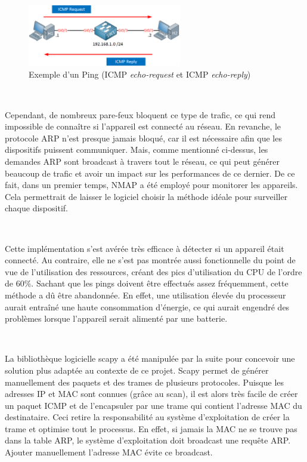 \begin{figure}[ht!]
  \centering
  \includegraphics[width=0.60\textwidth]{img/app/ping.png}
  \caption{Exemple d'un Ping (ICMP \textit{echo-request} et ICMP \textit{echo-reply})}
  \label{fig:icmp}
\end{figure}


~

\noindent
Cependant, de nombreux pare-feux bloquent ce type de trafic, ce qui rend impossible de connaître si l'appareil est connecté au réseau. En revanche, le protocole ARP n'est presque jamais bloqué, car il est nécessaire afin que les dispositifs puissent communiquer. Mais, comme mentionné ci-dessus, les demandes ARP sont broadcast à travers tout le réseau, ce qui peut générer beaucoup de trafic et avoir un impact sur les performances de ce dernier. De ce fait, dans un premier temps, NMAP a été employé pour monitorer les appareils. Cela permettrait de laisser le logiciel choisir la méthode idéale pour surveiller chaque dispositif.

~

\noindent
Cette implémentation s'est avérée très efficace à détecter si un appareil était connecté. Au contraire, elle ne s'est pas montrée aussi fonctionnelle du point de vue de l'utilisation des ressources, créant des pics d'utilisation du CPU de l'ordre de $60\%$. Sachant que les pings doivent être effectués assez fréquemment, cette méthode a dû être abandonnée. En effet, une utilisation élevée du processeur aurait entraîné une haute consommation d'énergie, ce qui aurait engendré des problèmes lorsque l'appareil serait alimenté par une batterie.

~

\noindent
La bibliothèque logicielle scapy a été manipulée par la suite pour concevoir une solution plus adaptée au contexte de ce projet. Scapy permet de générer manuellement des paquets et des trames de plusieurs protocoles. Puisque les adresses IP et MAC sont connues (grâce au scan), il est alors très facile de créer un paquet ICMP et de l'encapsuler par une trame qui contient l'adresse MAC du destinataire. Ceci retire la responsabilité au système d'exploitation de créer la trame et optimise tout le processus. En effet, si jamais la MAC ne se trouve pas dans la table ARP, le système d'exploitation doit broadcast une requête ARP. Ajouter manuellement l'adresse MAC évite ce broadcast.

